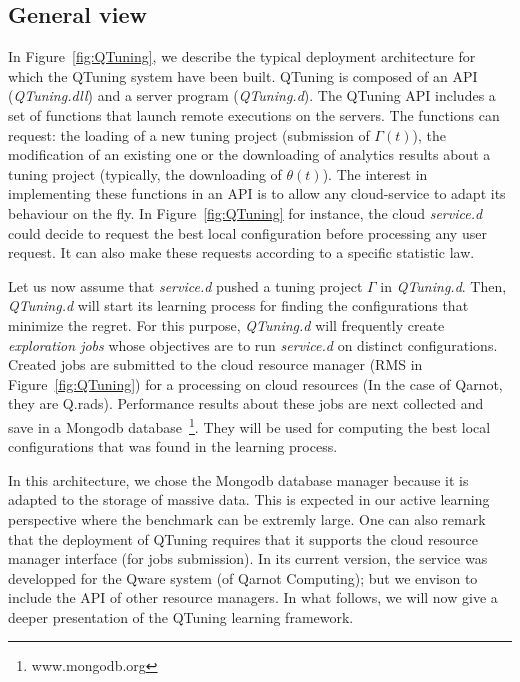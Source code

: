 \documentclass[10pt, conference, compsocconf]{IEEEtran}
\begin{document}
\subsection{General view}

	\begin{figure*}[hbtp]
	\begin{center}
	
	\caption{In-situ computing with QTuning}
	\label{fig:QTuning}
	\end{center}
	\end{figure*}


In Figure~\ref{fig:QTuning}, we describe the typical deployment architecture for which the 
QTuning system have been built. QTuning is composed of an API ({\it QTuning.dll}) and 
a server program ({\it QTuning.d}). The QTuning API includes a set of functions that 
launch remote executions on the servers. The functions can request: the loading of a new tuning project (submission of 
$\Gamma(t)$), the modification of an existing one or the downloading of analytics results about a tuning project 
(typically, the downloading of $\theta(t)$). The interest in implementing these functions in an API is 
to allow any cloud-service to adapt its behaviour on the fly. In Figure~\ref{fig:QTuning} for instance,  
the cloud {\it service.d} could decide to request the best local configuration before processing any user request. 
It can also make these requests according to a specific statistic law.

Let us now assume that {\it service.d} pushed a tuning project $\Gamma$ in  {\it QTuning.d}. Then, 
{\it QTuning.d} will start its  learning process for finding the configurations that minimize the regret. 
For this purpose, {\it QTuning.d} will frequently create {\it exploration jobs} whose objectives are to run 
 {\it service.d} on distinct configurations. Created jobs are submitted to the cloud resource manager (RMS in 
Figure~\ref{fig:QTuning}) for a processing on cloud resources (In the case of Qarnot, they are Q.rads). 
Performance results about these jobs are next collected and save in a Mongodb database~\footnote{www.mongodb.org}. 
They will be used for computing the best local configurations that was found in the learning process.

In this architecture, we chose the Mongodb database manager because it is adapted to the storage of massive data. 
This is expected in our active learning perspective where the benchmark can be extremly large.
One can also remark that the deployment of QTuning requires that it supports the cloud resource manager 
interface (for jobs submission). In its current version, the service was developped for the Qware 
system (of Qarnot Computing); but we envison to include the API of other resource managers. 
In what follows, we will now give a deeper presentation of the QTuning learning framework.
\end{document}
